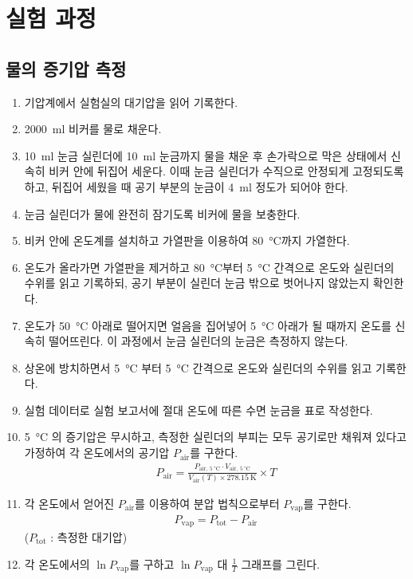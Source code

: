 \documentclass[a4paper,10pt]{article}
\begin{document}
	\section{실험 과정}
	
	\subsection{물의 증기압 측정}
	\begin{enumerate}
		\item 기압계에서 실험실의 대기압을 읽어 기록한다.
		\item \SI{2000}{\milli\litre} 비커를 물로 채운다.
		\item \SI{10}{\milli\litre} 눈금 실린더에 \SI{10}{\milli\litre} 눈금까지 물을 채운 후 손가락으로 막은 상태에서 신속히 비커 안에 뒤집어 세운다. 이때 눈금 실린더가 수직으로 안정되게 고정되도록 하고, 뒤집어 세웠을 때 공기 부분의 눈금이 \SI{4}{\milli\litre} 정도가 되어야 한다.
		\item 눈금 실린더가 물에 완전히 잠기도록 비커에 물을 보충한다.
		\item 비커 안에 온도계를 설치하고 가열판을 이용하여 \SI{80}{\degreeCelsius}까지 가열한다.
		\item 온도가 올라가면 가열판을 제거하고 \SI{80}{\degreeCelsius}부터 \SI{5}{\degreeCelsius} 간격으로 온도와 실린더의 수위를 읽고 기록하되, 공기 부분이 실린더 눈금 밖으로 벗어나지 않았는지 확인한다.
		\item 온도가 \SI{50}{\degreeCelsius} 아래로 떨어지면 얼음을 집어넣어 \SI{5}{\degreeCelsius} 아래가 될 때까지 온도를 신속히 떨어뜨린다. 이 과정에서 눈금 실린더의 눈금은 측정하지 않는다.
		\item 상온에 방치하면서 \SI{5}{\degreeCelsius} 부터 \SI{5}{\degreeCelsius} 간격으로 온도와 실린더의 수위를 읽고 기록한다.
		\item 실험 데이터로 실험 보고서에 절대 온도에 따른 수면 눈금을 표로 작성한다.
		\item \SI{5}{\degreeCelsius} 의 증기압은 무시하고, 측정한 실린더의 부피는 모두 공기로만 채워져 있다고 가정하여 각 온도에서의 공기압 $P_{\mathrm{air}}$를 구한다.
		\begin{gather*}
			P_{\mathrm{air}} = \frac{P_{\mathrm{air,~\SI{5}{\degreeCelsius}}} \cdot V_{\mathrm{air,~\SI{5}{\degreeCelsius}}}}{V_{\mathrm{air}}(T) \times \SI{278.15}{\kelvin}} \times T
		\end{gather*}
		\item 각 온도에서 얻어진 $P_{\mathrm{air}}$를 이용하여 분압 법칙으로부터 $P_{\mathrm{vap}}$를 구한다.
		\begin{gather*}
			P_{\mathrm{vap}} = P_{\mathrm{tot}} - P_{\mathrm{air}}
		\end{gather*}
		($P_{\mathrm{tot}}$ : 측정한 대기압)
		\item 각 온도에서의 $\ln P_{\mathrm{vap}}$를 구하고 $\ln P_{\mathrm{vap}}$ 대 $\frac{1}{T}$ 그래프를 그린다.
	\end{enumerate}
\end{document}
